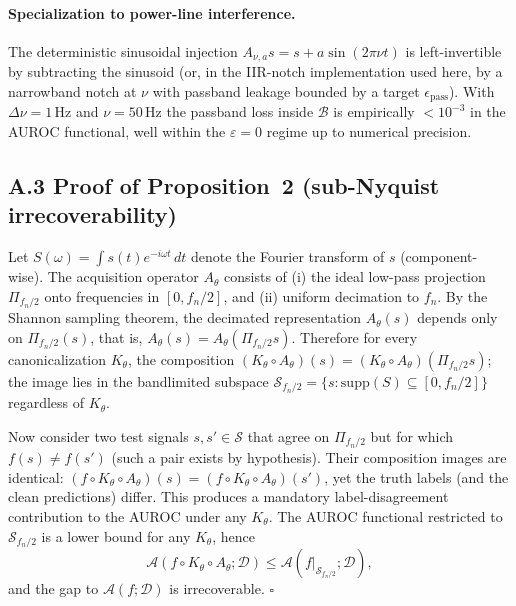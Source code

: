 \documentclass[conference]{IEEEtran}
\begin{document}
\paragraph{Specialization to power-line interference.} The
deterministic sinusoidal injection $A_{\nu,a} s = s + a \sin(2\pi \nu
t)$ is left-invertible by subtracting the sinusoid (or, in the
IIR-notch implementation used here, by a narrowband notch at $\nu$ with
passband leakage bounded by a target $\epsilon_{\text{pass}}$). With
$\Delta \nu = 1$\,Hz and $\nu = 50$\,Hz the passband loss inside
$\mathcal{B}$ is empirically $<10^{-3}$ in the AUROC functional, well
within the $\varepsilon = 0$ regime up to numerical precision.

\subsection*{A.3 Proof of Proposition~2 (sub-Nyquist irrecoverability)}
\label{app:proof_nyquist}
Let $S(\omega) = \int s(t) e^{-i\omega t}\,dt$ denote the Fourier
transform of $s$ (component-wise). The acquisition operator $A_\theta$
consists of (i) the ideal low-pass projection $\Pi_{f_n/2}$ onto
frequencies in $[0, f_n/2]$, and (ii) uniform decimation to $f_n$. By
the Shannon sampling theorem, the decimated representation
$A_\theta(s)$ depends only on $\Pi_{f_n/2}(s)$, that is,
$A_\theta(s) = A_\theta(\Pi_{f_n/2} s)$. Therefore for every
canonicalization $K_\theta$, the composition
$(K_\theta \circ A_\theta)(s) = (K_\theta \circ A_\theta)(\Pi_{f_n/2}
s)$; the image lies in the bandlimited subspace
$\mathcal{S}_{f_n/2} = \{s : \mathrm{supp}(S) \subseteq [0, f_n/2]\}$
regardless of $K_\theta$.

Now consider two test signals $s, s' \in \mathcal{S}$ that agree on
$\Pi_{f_n/2}$ but for which $f(s) \ne f(s')$ (such a pair exists by
hypothesis). Their composition images are identical:
$(f \circ K_\theta \circ A_\theta)(s) = (f \circ K_\theta \circ
A_\theta)(s')$, yet the truth labels (and the clean predictions)
differ. This produces a mandatory label-disagreement contribution to
the AUROC under any $K_\theta$. The AUROC functional restricted to
$\mathcal{S}_{f_n/2}$ is a lower bound for any $K_\theta$, hence
\[
\mathcal{A}(f \circ K_\theta \circ A_\theta; \mathcal{D}) \le
\mathcal{A}(f|_{\mathcal{S}_{f_n/2}}; \mathcal{D}),
\]
and the gap to $\mathcal{A}(f; \mathcal{D})$ is irrecoverable.
$\square$
\end{document}
